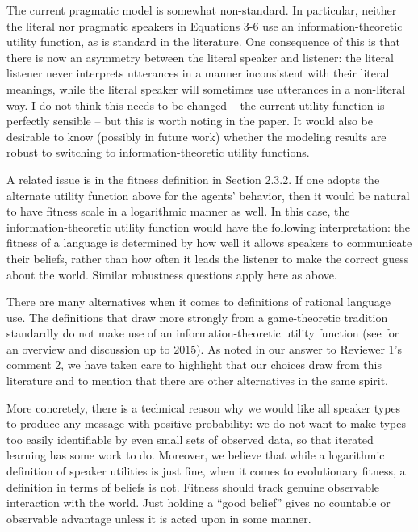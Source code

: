 \documentclass[12pt,a4paper]{article}
\begin{document}
\begin{mdframed}[backgroundcolor=gray!25,linecolor=gray!25,frametitle= Reviewer \thereviewerCounter~comment \thereviewerCommentCounter \hfill ~~({\it definitions in rational language use})]
%
The current pragmatic model is somewhat non-standard. In particular, neither the literal nor pragmatic speakers in Equations 3-6 use an information-theoretic utility function, as is standard in the literature. One consequence of this is that there is now an asymmetry between the literal speaker and listener: the literal listener never interprets utterances in a manner inconsistent with their literal meanings, while the literal speaker will sometimes use utterances in a non-literal way. I do not think this needs to be changed -- the current utility function is perfectly sensible -- but this is worth noting in the paper. It would also be desirable to know (possibly in future work) whether the modeling results are robust to switching to information-theoretic utility functions.

%
\end{mdframed}
\begin{mdframed}[backgroundcolor=gray!25,linecolor=gray!25]
%
A related issue is in the fitness definition in Section 2.3.2. If one adopts the alternate utility function above for the agents' behavior, then it would be natural to have fitness scale in a logarithmic manner as well. In this case, the information-theoretic utility function would have the following interpretation: the fitness of a language is determined by how well it allows speakers to communicate their beliefs, rather than how often it leads the listener to make the correct guess about the world. Similar robustness questions apply here as above.

%
\end{mdframed}
There are many alternatives when it comes to definitions of rational language use. The definitions that draw more strongly from a game-theoretic tradition standardly do not make use of an information-theoretic utility function (see \citealt{qing+franke:2015} for an overview and discussion up to $2015$). As noted in our answer to Reviewer 1's comment 2, we have taken care to highlight that our choices draw from this literature and to mention that there are other alternatives in the same spirit. 

More concretely, there is a technical reason why we would like all speaker types to produce any message with positive probability: we do not want to make types too easily identifiable by even small sets of observed data, so that iterated learning has some work to do. Moreover, we believe that while a logarithmic definition of speaker utilities is just fine, when it comes to evolutionary fitness, a definition in terms of beliefs is not. Fitness should track genuine observable interaction with the world. Just holding a ``good belief'' gives no countable or observable advantage unless it is acted upon in some manner. 
\end{document}
